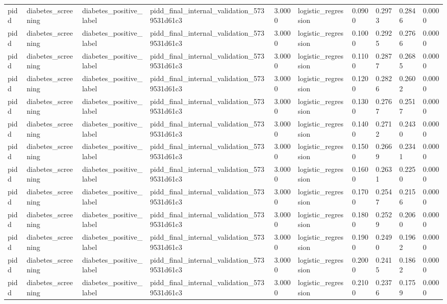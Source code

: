 \begin{tabular}{llllllllll}
pidd & diabetes\_screening & diabetes\_positive\_label & pidd\_final\_internal\_validation\_5739531d61c3 & 3.0000 & logistic\_regression & 0.0900 & 0.2973 & 0.2846 & 0.0000 \\
pidd & diabetes\_screening & diabetes\_positive\_label & pidd\_final\_internal\_validation\_5739531d61c3 & 3.0000 & logistic\_regression & 0.1000 & 0.2925 & 0.2766 & 0.0000 \\
pidd & diabetes\_screening & diabetes\_positive\_label & pidd\_final\_internal\_validation\_5739531d61c3 & 3.0000 & logistic\_regression & 0.1100 & 0.2877 & 0.2685 & 0.0000 \\
pidd & diabetes\_screening & diabetes\_positive\_label & pidd\_final\_internal\_validation\_5739531d61c3 & 3.0000 & logistic\_regression & 0.1200 & 0.2826 & 0.2602 & 0.0000 \\
pidd & diabetes\_screening & diabetes\_positive\_label & pidd\_final\_internal\_validation\_5739531d61c3 & 3.0000 & logistic\_regression & 0.1300 & 0.2767 & 0.2517 & 0.0000 \\
pidd & diabetes\_screening & diabetes\_positive\_label & pidd\_final\_internal\_validation\_5739531d61c3 & 3.0000 & logistic\_regression & 0.1400 & 0.2712 & 0.2430 & 0.0000 \\
pidd & diabetes\_screening & diabetes\_positive\_label & pidd\_final\_internal\_validation\_5739531d61c3 & 3.0000 & logistic\_regression & 0.1500 & 0.2669 & 0.2341 & 0.0000 \\
pidd & diabetes\_screening & diabetes\_positive\_label & pidd\_final\_internal\_validation\_5739531d61c3 & 3.0000 & logistic\_regression & 0.1600 & 0.2631 & 0.2250 & 0.0000 \\
pidd & diabetes\_screening & diabetes\_positive\_label & pidd\_final\_internal\_validation\_5739531d61c3 & 3.0000 & logistic\_regression & 0.1700 & 0.2547 & 0.2156 & 0.0000 \\
pidd & diabetes\_screening & diabetes\_positive\_label & pidd\_final\_internal\_validation\_5739531d61c3 & 3.0000 & logistic\_regression & 0.1800 & 0.2529 & 0.2060 & 0.0000 \\
pidd & diabetes\_screening & diabetes\_positive\_label & pidd\_final\_internal\_validation\_5739531d61c3 & 3.0000 & logistic\_regression & 0.1900 & 0.2490 & 0.1962 & 0.0000 \\
pidd & diabetes\_screening & diabetes\_positive\_label & pidd\_final\_internal\_validation\_5739531d61c3 & 3.0000 & logistic\_regression & 0.2000 & 0.2415 & 0.1862 & 0.0000 \\
pidd & diabetes\_screening & diabetes\_positive\_label & pidd\_final\_internal\_validation\_5739531d61c3 & 3.0000 & logistic\_regression & 0.2100 & 0.2376 & 0.1759 & 0.0000 \\

\end{tabular}
